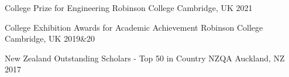 



\begin{cvhonors}

  \cvhonor
    {College Prize for Engineering} %
    {Robinson College} %
    {Cambridge, UK} %
    {2021} %

  \cvhonor
    {College Exhibition Awards for Academic Achievement} %
    {Robinson College} %
    {Cambridge, UK} %
    {2019\&20} %

  \cvhonor
    {New Zealand Outstanding Scholars - Top 50 in Country} %
    {NZQA} %
    {Auckland, NZ} %
    {2017} %

\end{cvhonors}